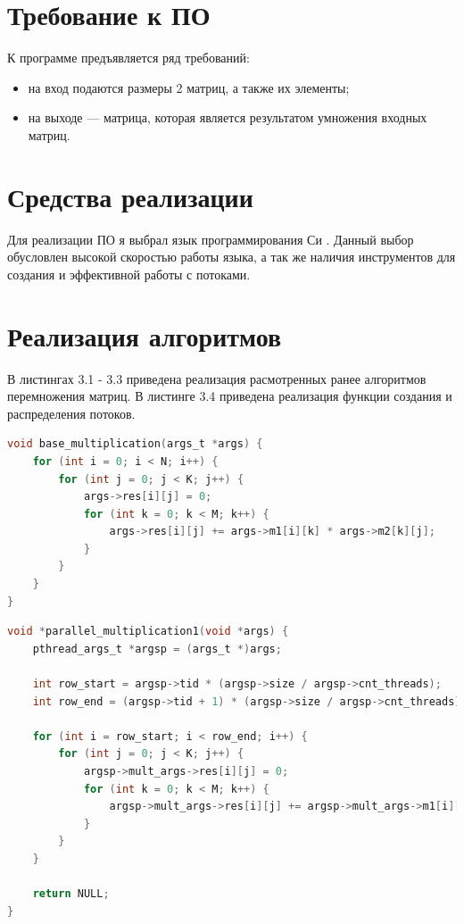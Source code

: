 \documentclass[12pt]{report}
\begin{document}
\section{Требование к ПО}

К программе предъявляется ряд требований:

\begin{itemize}
	\item на вход подаются размеры 2 матриц, а также их элементы;
	\item на выходе — матрица, которая является результатом умножения входных матриц.
\end{itemize}

\section{Средства реализации}
Для реализации ПО я выбрал язык программирования Си \cite{C}. Данный выбор обусловлен высокой скоростью работы языка, а так же наличия инструментов для создания и эффективной работы с потоками.

\section{Реализация алгоритмов}

В листингах 3.1 - 3.3 приведена реализация расмотренных ранее алгоритмов перемножения матриц.
В листинге 3.4 приведена реализация функции создания и распределения потоков.

\begin{lstlisting}[label=some-code,caption=Функция умножения матриц обычным способом, language=C]
void base_multiplication(args_t *args) {
	for (int i = 0; i < N; i++) {
		for (int j = 0; j < K; j++) {
			args->res[i][j] = 0;
			for (int k = 0; k < M; k++) {
				args->res[i][j] += args->m1[i][k] * args->m2[k][j];
			}
		}
	}
}
\end{lstlisting}

\begin{lstlisting}[label=some-code,caption=Функция умножения матриц параллельно. Способ №1,language=C]
void *parallel_multiplication1(void *args) {
	pthread_args_t *argsp = (args_t *)args;

	int row_start = argsp->tid * (argsp->size / argsp->cnt_threads);
	int row_end = (argsp->tid + 1) * (argsp->size / argsp->cnt_threads);

	for (int i = row_start; i < row_end; i++) {
		for (int j = 0; j < K; j++) {
			argsp->mult_args->res[i][j] = 0;
			for (int k = 0; k < M; k++) {
				argsp->mult_args->res[i][j] += argsp->mult_args->m1[i][k] * argsp->mult_args->m2[k][j];
			}
		}
	}

	return NULL;
}

\end{lstlisting}
\end{document}

